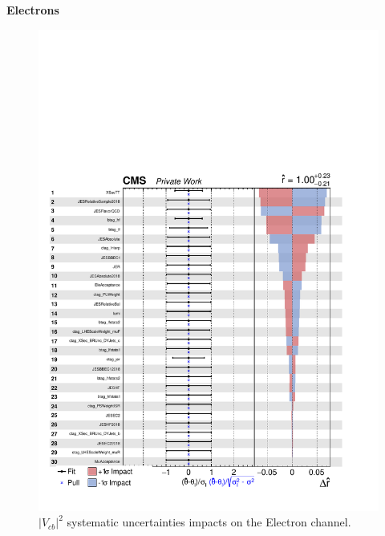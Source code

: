 \hspace{0pt}
\vfill
\begin{center}
     {\Huge \textbf{Electrons}}
\end{center}
\begin{figure}[H]
    \centering
    \includegraphics[width=\linewidth]{fig/chap09-sigback/electron_impact.pdf}
    \caption{$|V_{cb}|^2$ systematic uncertainties impacts on the Electron channel.}
    \label{fig:EleImpact}
\end{figure}
\vfill
\hspace{0pt}

